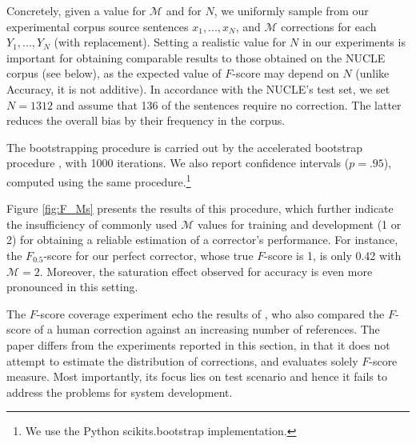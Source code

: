 \documentclass[letterpaper, 11pt]{article}
\begin{document}
Concretely, given a value for $\mathcal{M}$ and for $N$, we uniformly sample from our experimental corpus source sentences $x_1,...,x_N$, and $\mathcal{M}$ corrections for each $Y_1,...,Y_N$ (with replacement).
Setting a realistic value for $N$ in our experiments is important for obtaining comparable results to those obtained on the NUCLE corpus (see below), 
as the expected value of $F$-score may depend on $N$ (unlike Accuracy, it is not additive).
In accordance with the NUCLE's test set, we set $N=1312$ and assume that 136 of the sentences require no correction.
The latter reduces the overall bias by their frequency in the corpus.

The bootstrapping procedure is carried out by the accelerated bootstrap procedure \cite{efron1987better}, with 1000 iterations.
We also report confidence intervals ($p=.95$), computed using the same procedure.\footnote{We use the Python scikits.bootstrap implementation.}
%

Figure \ref{fig:F_Ms} presents the results of this procedure, which
further indicate the insufficiency of commonly used $\mathcal{M}$ values for training and development (1 or 2) for obtaining a reliable estimation of a corrector's performance.
For instance, the $F_{0.5}$-score for our perfect corrector, whose true $F$-score is 1,
is only 0.42 with $\mathcal{M}=2$.
Moreover, the saturation effect observed for accuracy is even more pronounced in this setting.

\begin{figure}
	\texttt{[image: \$F\_\{0.5]}$_Ms_significance}
	\caption{
		$F_{0.5}$ values for a perfect corrector (y-axis) as a function of the number of references $\mathcal{M}$ (x-axis).
		Each data point is paired with a confidence interval ($p=.95$).\label{fig:F_Ms}}
	\vspace{-0.5cm}
\end{figure}

The $F$-score coverage experiment echo the results of ,
who also compared the $F$-score of a human correction against an increasing number of references. The paper differs from the experiments reported in this section, in that it does not attempt to estimate the distribution of corrections, and evaluates solely $F$-score measure. Most importantly, its focus lies on test scenario and hence it fails to address the problems for system development.
\end{document}
